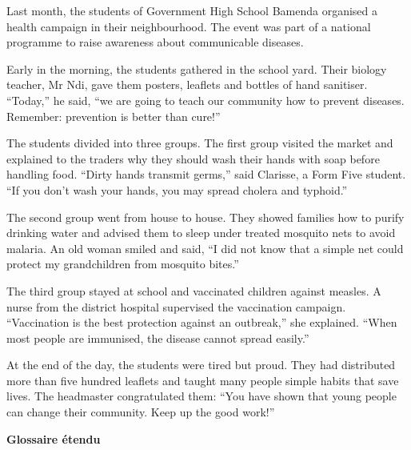 \documentclass[11pt]{article}
\begin{document}
\begin{textebox}
Last month, the students of Government High School Bamenda organised a health campaign in their neighbourhood. The event was part of a national programme to raise awareness about communicable diseases.

Early in the morning, the students gathered in the school yard. Their biology teacher, Mr Ndi, gave them posters, leaflets and bottles of hand sanitiser. “Today,” he said, “we are going to teach our community how to prevent diseases. Remember: prevention is better than cure!”

The students divided into three groups. The first group visited the market and explained to the traders why they should wash their hands with soap before handling food. “Dirty hands transmit germs,” said Clarisse, a Form Five student. “If you don't wash your hands, you may spread cholera and typhoid.”

The second group went from house to house. They showed families how to purify drinking water and advised them to sleep under treated mosquito nets to avoid malaria. An old woman smiled and said, “I did not know that a simple net could protect my grandchildren from mosquito bites.”

The third group stayed at school and vaccinated children against measles. A nurse from the district hospital supervised the vaccination campaign. “Vaccination is the best protection against an outbreak,” she explained. “When most people are immunised, the disease cannot spread easily.”

At the end of the day, the students were tired but proud. They had distributed more than five hundred leaflets and taught many people simple habits that save lives. The headmaster congratulated them: “You have shown that young people can change their community. Keep up the good work!”
\end{textebox}

\textbf{Glossaire étendu}
\end{document}
